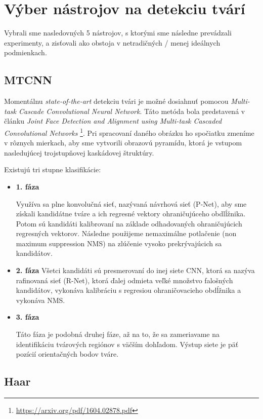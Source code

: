 \documentclass[]{article}
\begin{document}
	\section{Výber nástrojov na detekciu tvárí}
	
	Vybrali sme nasledovných 5 nástrojov, s ktorými sme následne prevádzali experimenty, a zisťovali ako obstoja v netradičných / menej ideálnych podmienkach.
	
	\subsection*{MTCNN}
	Momentálnu \textit{state-of-the-art} detekciu tvári je možné dosiahnuť pomocou \textit{Multi-task Cascade Convolutional Neural Network}. Táto metóda bola predstavená v článku \textit{Joint Face Detection and Alignment using Multi-task Cascaded Convolutional Networks} \footnote{\url{https://arxiv.org/pdf/1604.02878.pdf}}. Pri spracovaní daného obrázku ho spočiatku zmeníme v rôznych mierkach, aby sme vytvorili obrazovú pyramídu, ktorá je vstupom nasledujúcej trojstupňovej kaskádovej štruktúry. 
	
	\newpage
	\noindent Existujú tri stupne klasifikácie:
	
	\begin{itemize}
		\item \textbf{1. fáza}
		
		Využíva sa plne konvolučná sieť, nazývaná návrhová sieť (P-Net), aby sme získali kandidátne tváre a ich regresné vektory ohraničujúceho obdlĺžnika. Potom sú kandidáti kalibrovaní na základe odhadovaných ohraničujúcich regresných vektorov. Následne použijeme nemaximálne potlačenie (non maximum suppression NMS) na zlúčenie vysoko prekrývajúcich sa kandidátov.
		
		\item \textbf{2. fáza}
		Všetci kandidáti sú presmerovaní do inej siete CNN, ktorá sa nazýva rafinovaná sieť (R-Net), ktorá ďalej odmieta veľké množstvo falošných kandidátov, vykonáva kalibráciu s regresiou ohraničovacieho obdĺžnika a vykonáva NMS.
		
		\item \textbf{3. fáza}
		
		Táto fáza je podobná druhej fáze, až na to, že sa zameriavame na identifikáciu tvárových regiónov s väčším dohľadom. Výstup siete je päť pozícií orientačných bodov tváre.
	\end{itemize}

	\subsection*{Haar}
	
\end{document}
